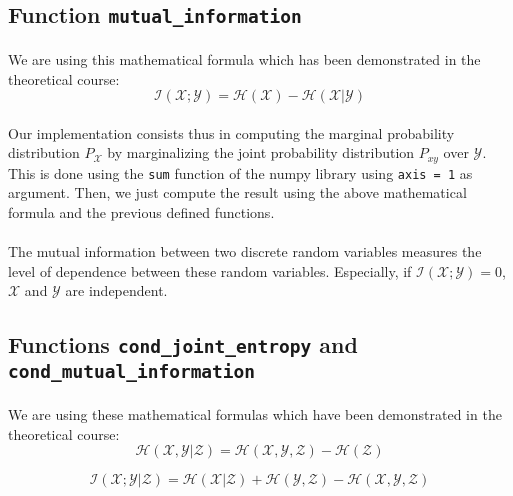 \documentclass[a4paper, 11pt, oneside]{article}
\begin{document}
\subsection{Function \texttt{mutual\_information}}

\paragraph{}We are using this mathematical formula which has been demonstrated in the theoretical course: 
$$ \mathcal{I}(\mathcal{X}; \mathcal{Y}) = \mathcal{H}(\mathcal{X}) - \mathcal{H}(\mathcal{X}| \mathcal{Y})$$

\paragraph{}Our implementation consists thus in computing the marginal probability distribution $P_\mathcal{X}$ by marginalizing the joint probability distribution $P_{xy}$ over $\mathcal{Y}$. This is done using the \texttt{sum} function of the numpy library using \texttt{axis = 1} as argument. Then, we just compute the result using the above mathematical formula and the previous defined functions.

\paragraph{}The mutual information between two discrete random variables measures the level of dependence between these random variables. Especially, if $\mathcal{I}(\mathcal{X}; \mathcal{Y}) = 0$, $\mathcal{X}$ and $\mathcal{Y}$ are independent.

\subsection{Functions \texttt{cond\_joint\_entropy} and \texttt{cond\_mutual\_information}}

\paragraph{}We are using these mathematical formulas which have been demonstrated in the theoretical course: 
$$ \mathcal{H}(\mathcal{X}, \mathcal{Y} | \mathcal{Z}) = \mathcal{H}(\mathcal{X}, \mathcal{Y}, \mathcal{Z}) - \mathcal{H}(\mathcal{Z})$$

$$ \mathcal{I}(\mathcal{X}; \mathcal{Y} | \mathcal{Z}) = \mathcal{H}(\mathcal{X} | \mathcal{Z}) + \mathcal{H}(\mathcal{Y}, \mathcal{Z}) - \mathcal{H}(\mathcal{X}, \mathcal{Y}, \mathcal{Z})$$
\end{document}
